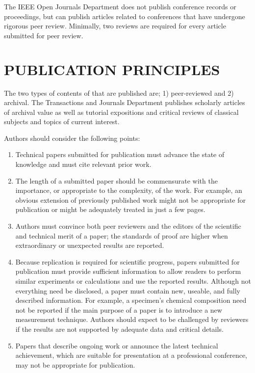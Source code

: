 \documentclass{IEEEoj}
\begin{document}
The IEEE Open Journals Department does not publish conference records or 
proceedings, but can publish articles related to conferences that have 
undergone rigorous peer review. Minimally, two reviews are required for 
every article submitted for peer review.

\section{PUBLICATION PRINCIPLES}
The two types of contents of that are published are; 1) peer-reviewed and 2) 
archival. The Transactions and Journals Department publishes scholarly 
articles of archival value as well as tutorial expositions and critical 
reviews of classical subjects and topics of current interest. 

Authors should consider the following points:

\begin{enumerate}
\item Technical papers submitted for publication must advance the state of knowledge and must cite relevant prior work. 
\item The length of a submitted paper should be commensurate with the importance, or appropriate to the complexity, of the work. For example, an obvious extension of previously published work might not be appropriate for publication or might be adequately treated in just a few pages.
\item Authors must convince both peer reviewers and the editors of the scientific and technical merit of a paper; the standards of proof are higher when extraordinary or unexpected results are reported. 
\item Because replication is required for scientific progress, papers submitted for publication must provide sufficient information to allow readers to perform similar experiments or calculations and use the reported results. Although not everything need be disclosed, a paper must contain new, useable, and fully described information. For example, a specimen's chemical composition need not be reported if the main purpose of a paper is to introduce a new measurement technique. Authors should expect to be challenged by reviewers if the results are not supported by adequate data and critical details.
\item Papers that describe ongoing work or announce the latest technical achievement, which are suitable for presentation at a professional conference, may not be appropriate for publication.
\end{enumerate}
\end{document}
